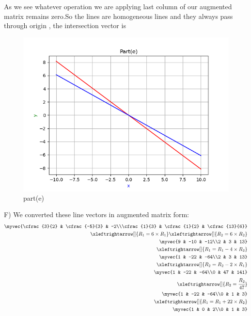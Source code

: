 \begin{enumerate}[label=\thesection.\arabic*.,ref=\thesection.\theenumi]
As we see whatever operation we are applying last column of our augmented matrix remains zero.So the lines are homogeneous lines and they always pass through  origin , the intersection vector is \\

\renewcommand{\thefigure}{\theenumi.\arabic{figure}}
\begin{figure}[!ht]
    \centering
    \includegraphics[width=\columnwidth]{./figures/A1_parte}
\caption{part(e)}
\label{fig: part(e)}
\end{figure}

F)
We converted these line vectors in augmented matrix form:\\ 

\begin{align*}
    \myvec{\cfrac{3}{2} & \cfrac{-5}{3} & -2\\\cfrac{1}{3} & \cfrac{1}{2} & \cfrac{13}{6}}
\\
    \xleftrightarrow[]{R_{1}=6\times R_{1}}
    \xleftrightarrow[]{R_{2}=6\times R_{2}}
\\
    \myvec{9 & -10 & -12\\2 & 3 & 13}
\\
    \xleftrightarrow[]{R_{1}=R_{1}-4\times R_{2}}
\\
    \myvec{1 & -22 & -64\\2 & 3 & 13}
\\
    \xleftrightarrow[]{R_{2}=R_{2}-2\times R_{1}} 
\\
    \myvec{1 & -22 & -64\\0 & 47 & 141}
\\
    \xleftrightarrow[]{R_{2}=\cfrac{R_{2}}{47}} 
\\
    \myvec{1 & -22 & -64\\0 & 1 & 3}
\\
    \xleftrightarrow[]{R_{1}=R_{1}+22\times R_{2}}
\\
    \myvec{1 & 0 & 2\\0 & 1 & 3}
\end{align*}


\end{enumerate}
